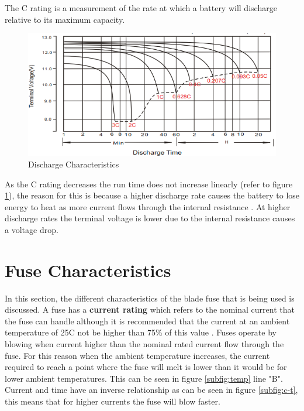 \label{sec:Discharge}
\par The C rating is a measurement of the rate at which a battery will discharge relative to its maximum capacity\cite{MIT}. 
\begin{figure}
\centering
\includegraphics[scale=0.5]{Figures/fig2.png}
\caption{Discharge Characteristics \cite{Charging-Lead}}
\label{fig:discharge}
\end{figure}
 As the C rating decreases the run time does not increase linearly (refer to figure \ref{fig:discharge}), the reason for this is because a higher discharge rate causes the battery to lose energy to heat as more current flows through the internal resistance \cite{pSonic}. At higher discharge rates the terminal voltage is lower due to the internal resistance causes a voltage drop.



\section{Fuse Characteristics}\label{sec:fuse_lit}
In this section, the different characteristics of the blade fuse that is being used is discussed. A fuse has a \textbf{current rating} which refers to the nominal current that the fuse can handle although it is recommended that the current at an ambient temperature of 25\textdegree C not be higher than 75\% of this value \cite{LF}. Fuses operate by blowing when current higher than the nominal rated current flow through the fuse. For this reason when the ambient temperature increases, the current required to reach a point where the fuse will melt is lower than it would be for lower ambient temperatures. This can be seen in figure \ref{subfig:temp} line "B". Current and time have an inverse relationship as can be seen in figure \ref{subfig:c-t}, this means that for higher currents the fuse will blow faster.


